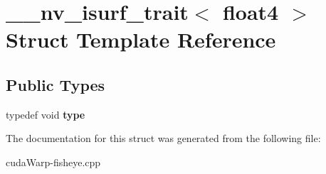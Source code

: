 \hypertarget{struct____nv__isurf__trait_3_01float4_01_4}{}\section{\+\_\+\+\_\+nv\+\_\+isurf\+\_\+trait$<$ float4 $>$ Struct Template Reference}
\label{struct____nv__isurf__trait_3_01float4_01_4}
\subsection*{Public Types}
\begin{DoxyCompactItemize}
\item 
typedef void {\bfseries type}\hypertarget{struct____nv__isurf__trait_3_01float4_01_4_a7b159300bdd0dc780d6c51f87333c208}{}\label{struct____nv__isurf__trait_3_01float4_01_4_a7b159300bdd0dc780d6c51f87333c208}

\end{DoxyCompactItemize}


The documentation for this struct was generated from the following file\+:\begin{DoxyCompactItemize}
\item 
cuda\+Warp-\/fisheye.\+cpp\end{DoxyCompactItemize}
